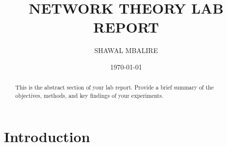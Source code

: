\documentclass{article}
\title{NETWORK THEORY LAB REPORT}
\author{SHAWAL MBALIRE}
\date{\today}
\begin{document}
\maketitle
\newpage

\begin{abstract}
    This is the abstract section of your lab report. Provide a brief summary of the objectives, methods, and key findings of your experiments.
\end{abstract}

\section{Introduction}



\end{document}
